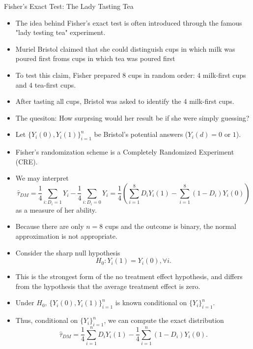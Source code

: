 \documentclass[11pt,aspectratio=169]{beamer}
\begin{document}
\begin{frame}{Fisher's Exact Test: The Lady Tasting Tea}
\begin{itemize}
  \item The idea behind Fisher's exact test is often introduced through the famous "lady testing tea" experiment.
  \item Muriel Bristol claimed that she could distinguish cups in which milk was poured first froms cups in which tea was poured first
  \item To test this claim, Fisher prepared 8 cups in random order: 4 milk-first cups and 4 tea-first cups.
  \item After tasting all cups, Bristol was asked to identify the 4 milk-first cups.
  \item The quesiton: How surprsing would her result be if she were simply guessing?
\end{itemize}



\end{frame}
\begin{frame}
\begin{itemize}
    \item Let $\{Y_i(0), Y_i(1)\}_{i=1}^n$ be Bristol's potential answers ($Y_i(d) = 0$ or $1$).
    \item Fisher's randomization scheme is a Completely Randomized Experiment (CRE).
    \item We may interpret
    $$\widehat{\tau}_{DM} = \frac{1}{4} \sum_{i:D_i=1} Y_i - \frac{1}{4} \sum_{i:D_i=0} Y_i = \frac{1}{4}\left(\sum_{i=1}^8 D_i Y_i(1) - \sum_{i=1}^8 (1 - D_i) Y_i(0)\right)$$
    as a measure of her ability.
    \item Because there are only $n = 8$ cups and the outcome is binary, the normal approximation is not appropriate.
\end{itemize}

\end{frame}
\begin{frame}
\begin{itemize}
    \item Consider the sharp null hypothesis
    $$H_0 : Y_i(1) = Y_i(0), \forall i.$$
    \item This is the strongest form of the no treatment effect hypothesis, and differs from the hypothesis that the average treatment effect is zero.
    \item Under $H_0$, $\{Y_i(0), Y_i(1)\}_{i=1}^n$ is known conditional on $\{Y_i\}_{i=1}^n$.
    \item Thus, conditional on $\{Y_i\}_{i=1}^n$, we can compute the exact distribution
    $$\widehat{\tau}_{DM} = \frac{1}{4} \sum_{i=1}^n D_i Y_i(1) - \frac{1}{4} \sum_{i=1}^n (1 - D_i) Y_i(0).$$
\end{itemize}

\end{frame}
\end{document}
